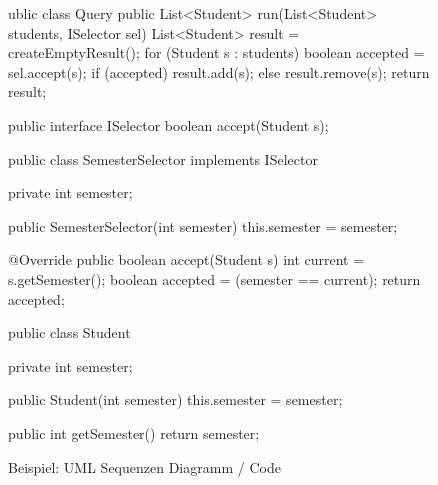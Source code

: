 \documentclass[ngerman]{tuda_summary}
\begin{document}
\begin{figure}[ht]
    \centering
	\begin{codeBlock}[autogobble]{}
        ublic class Query {
        	public List<Student> run(List<Student> students, ISelector sel) {
        		List<Student> result = createEmptyResult();
        		for (Student s : students) {
        			boolean accepted = sel.accept(s);
        			if (accepted) {
        				result.add(s);
        			} else {
        				result.remove(s);
        			}
        		}
        		return result;
        	}
        }
    \end{codeBlock}
	\begin{codeBlock}[autogobble]{}
        public interface ISelector {
        	boolean accept(Student s);
        }
	\end{codeBlock}
	\begin{codeBlock}[autogobble]{}
        public class SemesterSelector implements ISelector {
        	private int semester;

        	public SemesterSelector(int semester) {
        		this.semester = semester;
        	}

        	@Override
        	public boolean accept(Student s) {
        		int current = s.getSemester();
        		boolean accepted = (semester == current);
        		return accepted;
        	}
        }
	\end{codeBlock}
	\begin{codeBlock}[autogobble]{}
        public class Student {
        	private int semester;

        	public Student(int semester) {
        		this.semester = semester;
        	}

        	public int getSemester() {
        		return semester;
        	}
        }
	\end{codeBlock}
    \caption{Beispiel: UML Sequenzen Diagramm / Code}
    \label{fig:sequencecode}
\end{figure}
\end{document}
